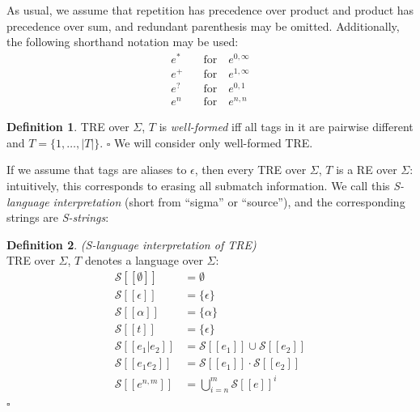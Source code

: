 \documentclass{article}
\newcommand{\Xeq}{\!=\!}
\newcommand{\Xlb}{[\![}
\newcommand{\Xrb}{]\!]}
\newcommand{\XS}{\mathcal{S}}
\theoremstyle{definition}
\newtheorem{Xdef}{Definition}
\begin{document}
\begin{multicols}{2}
    As usual, we assume that repetition has precedence over product and product has precedence over sum,
    and redundant parenthesis may be omitted.
    Additionally, the following shorthand notation may be used:
    \begin{align*}
        e^*     &\quad\text{for}\quad e^{0,\infty} \\[-0.5em]
        e^+     &\quad\text{for}\quad e^{1,\infty} \\[-0.5em]
        e^?     &\quad\text{for}\quad e^{0,1} \\[-0.5em]
        e^n     &\quad\text{for}\quad e^{n,n}
    \end{align*}

    \begin{Xdef}
    TRE over $\Sigma$, $T$ is \emph{well-formed} iff
    all tags in it are pairwise different
    and $T \Xeq \{ 1, \dots, |T| \}$.
    $\square$
    We will consider only well-formed TRE.
    \end{Xdef}

If we assume that tags are aliases to $\epsilon$, then every TRE over $\Sigma$, $T$ is a RE over $\Sigma$:
intuitively, this corresponds to erasing all submatch information. 
We call this \emph{S-language interpretation} (short from ``sigma'' or ``source''),
and the corresponding strings are \emph{S-strings}:

    \begin{Xdef}\label{defslang}
    \emph{(S-language interpretation of TRE)} \\
    TRE over $\Sigma$, $T$ denotes a language over $\Sigma$:
    \begin{align*}
        \XS \Xlb \emptyset \Xrb &= \emptyset \\
        \XS \Xlb \epsilon \Xrb &= \{ \epsilon \} \\
        \XS \Xlb \alpha \Xrb &= \{\alpha\} \\
        \XS \Xlb t \Xrb &= \{\epsilon\} \\
        \XS \Xlb e_1 | e_2 \Xrb &= \XS \Xlb e_1 \Xrb \cup \XS \Xlb e_2 \Xrb \\
        \XS \Xlb e_1 e_2 \Xrb &= \XS \Xlb e_1 \Xrb \cdot \XS \Xlb e_2 \Xrb \\
        \XS \Xlb e^{n,m} \Xrb &= \bigcup\limits_{i=n}^m \XS \Xlb e \Xrb ^i
    \end{align*}
    $\square$
    \end{Xdef}


\end{multicols}
\end{document}
